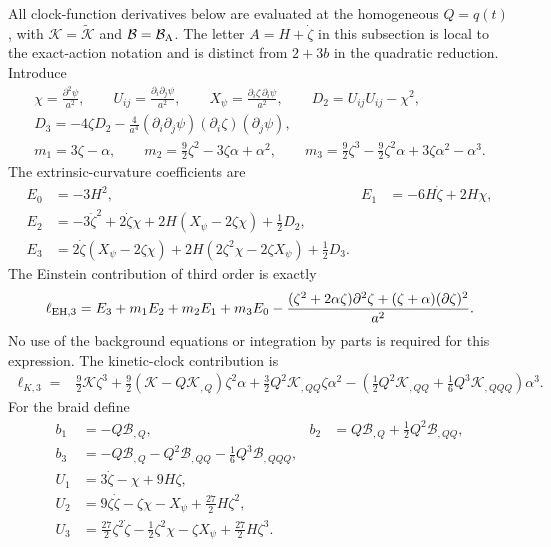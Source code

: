 \documentclass[aps,prd,reprint,onecolumn,notitlepage,nofootinbib,longbibliography,floatfix]{revtex4-2}
\theoremstyle{scstyle}
\theoremstyle{definition}
\theoremstyle{remark}
\newcommand{\cK}{\mathcal K}
\newcommand{\cB}{\mathcal B}
\newcommand{\Kt}{\widetilde{\mathcal K}}
\begin{document}
All clock-function derivatives below are evaluated at the homogeneous $Q=q(t)$, with $\cK=\Kt$ and $\cB=\cB_{\rm A}$. The letter $A=H+\dot\zeta$ in this subsection is local to the exact-action notation and is distinct from $2+3b$ in the quadratic reduction. Introduce
\begin{gather}
 \chi=\frac{\partial^2\psi}{a^2},\qquad
 U_{ij}=\frac{\partial_i\partial_j\psi}{a^2},\qquad
 X_\psi=\frac{\partial_i\zeta\,\partial_i\psi}{a^2},\qquad
 D_2=U_{ij}U_{ij}-\chi^2,\nonumber\\
 D_3=-4\zeta D_2-
 \frac{4}{a^4}(\partial_i\partial_j\psi)
 (\partial_i\zeta)(\partial_j\psi),\nonumber\\
 m_1=3\zeta-\alpha,\qquad
 m_2=\frac92\zeta^2-3\zeta\alpha+\alpha^2,\qquad
 m_3=\frac92\zeta^3-\frac92\zeta^2\alpha+3\zeta\alpha^2-\alpha^3.
\label{eq:eftCubicAbbreviations}
\end{gather}
The extrinsic-curvature coefficients are
\begin{align}
 E_0&=-3H^2,& E_1&=-6H\dot\zeta+2H\chi,\nonumber\\
 E_2&=-3\dot\zeta^2+2\dot\zeta\chi
       +2H(X_\psi-2\zeta\chi)+\tfrac12D_2,\nonumber\\
 E_3&=2\dot\zeta(X_\psi-2\zeta\chi)
       +2H(2\zeta^2\chi-2\zeta X_\psi)+\tfrac12D_3.
\label{eq:eftExtrinsicCoefficients}
\end{align}
The Einstein contribution of third order is exactly
\begin{equation}
 \ell_{{\rm EH},3}=E_3+m_1E_2+m_2E_1+m_3E_0
 -\frac{(\zeta^2+2\alpha\zeta)\partial^2\zeta
 +(\zeta+\alpha)(\partial\zeta)^2}{a^2}.
\label{eq:eftEH3}
\end{equation}
No use of the background equations or integration by parts is required for this expression. The kinetic-clock contribution is
\begin{align}
 \ell_{K,3}={}&\frac92\cK\zeta^3
 +\frac92(\cK-Q\cK_{,Q})\zeta^2\alpha
 +\frac32Q^2\cK_{,QQ}\zeta\alpha^2
 -\left(\frac12Q^2\cK_{,QQ}
        +\frac16Q^3\cK_{,QQQ}\right)\alpha^3.
\label{eq:eftK3}
\end{align}
For the braid define
\begin{align}
 b_1&=-Q\cB_{,Q},&
 b_2&=Q\cB_{,Q}+\tfrac12Q^2\cB_{,QQ},\nonumber\\
 b_3&=-Q\cB_{,Q}-Q^2\cB_{,QQ}
          -\tfrac16Q^3\cB_{,QQQ},\nonumber\\
 U_1&=3\dot\zeta-\chi+9H\zeta,\nonumber\\
 U_2&=9\zeta\dot\zeta-\zeta\chi-X_\psi+\tfrac{27}{2}H\zeta^2,\nonumber\\
 U_3&=\tfrac{27}{2}\zeta^2\dot\zeta
       -\tfrac12\zeta^2\chi-\zeta X_\psi
       +\tfrac{27}{2}H\zeta^3.
\label{eq:eftB3Abbreviations}
\end{align}
\end{document}
